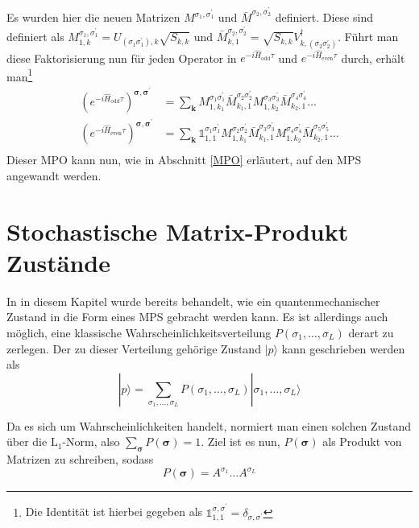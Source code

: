 \documentclass[10pt,a4paper]{report}
\newcommand{\SumIndex}{\sigma_1,\ldots,\sigma_L}
\begin{document}
Es wurden hier die neuen Matrizen $M^{\sigma_1,\sigma_1^{\prime}}$ und $\bar{M}^{\sigma_2,\sigma_2^{\prime}}$ definiert. Diese sind definiert als $M_{1,k}^{\sigma_1,\sigma_1^{\prime}}=U_{(\sigma_1 \sigma_1^\prime),k}\sqrt{S_{k,k}}$ und $\bar{M}_{k,1}^{\sigma_2,\sigma_2^{\prime}}=\sqrt{S_{k,k}}V_{k,(\sigma_2 \sigma_2^\prime)}^\dagger$. Führt man diese Faktorisierung nun für jeden Operator in $e^{-i\hat{H}_{\text{odd}}\tau}$ und $e^{-i\hat{H}_{\text{even}}\tau}$ durch, erhält man\footnote{Die Identität ist hierbei gegeben als $\mathbb{1}_{1,1}^{\sigma,\sigma^{\prime}}=\delta_{\sigma,\sigma^{\prime}}$}
\begin{equation}
\begin{split}
(e^{-i\hat{H}_{\text{odd}}\tau})^{\bm{\sigma},\bm{\sigma^\prime}}&=\sum_{\textbf{k}}M_{1,k_1}^{\sigma_1 \sigma_1^\prime} \bar{M}_{k_1,1}^{\sigma_2 \sigma_2^\prime}M_{1,k_2}^{\sigma_3 \sigma_3^\prime} \bar{M}_{k_2,1}^{\sigma_4 \sigma_4^\prime}\ldots\\
(e^{-i\hat{H}_{\text{even}}\tau})^{\bm{\sigma},\bm{\sigma^\prime}}&=\sum_{\textbf{k}}\mathbb{1}_{1,1}^{\sigma_1 \sigma_1^\prime} M_{1,k_1}^{\sigma_2 \sigma_2^\prime}\bar{M}_{k_1,1}^{\sigma_3 \sigma_3^\prime} M_{1,k_2}^{\sigma_4 \sigma_4^\prime}\bar{M}_{k_2,1}^{\sigma_5 \sigma_5^\prime}\ldots\\
\end{split}
\end{equation}
Dieser MPO kann nun, wie in Abschnitt \ref{MPO} erläutert, auf den MPS angewandt werden.

\section{Stochastische Matrix-Produkt Zustände}
In in diesem Kapitel wurde bereits behandelt, wie ein quantenmechanischer Zustand in die Form eines MPS gebracht werden kann. Es ist allerdings auch möglich, eine klassische Wahrscheinlichkeitsverteilung $P(\SumIndex)$ derart zu zerlegen. Der zu dieser Verteilung gehörige Zustand $|p\rangle$ kann geschrieben werden als
\begin{equation}
|p\rangle=\sum_{\SumIndex}P(\SumIndex)|\SumIndex\rangle
\end{equation}

Da es sich um Wahrscheinlichkeiten handelt, normiert man einen solchen Zustand über die $\text{L}_1$-Norm, also $\sum_{\bm{\sigma}}P(\bm{\sigma})=1$. Ziel ist es nun, $P(\bm{\sigma})$ als Produkt von Matrizen zu schreiben, sodass
\begin{equation}
P(\bm{\sigma})=A^{\sigma_1}\ldots A^{\sigma_L}
\end{equation}
\end{document}
